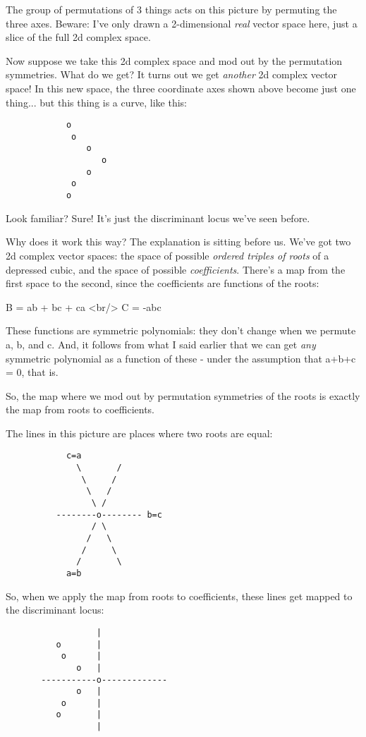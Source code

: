 The group of permutations of 3 things acts on this picture 
by permuting the three axes.  Beware: I've only drawn a 2-dimensional 
\emph{real} vector space here, just a slice of the full 2d complex space.  

Now suppose we take this 2d complex space and mod out by the 
permutation symmetries.  What do we get?  It turns out we get \emph{another}
2d complex vector space!   In this new space, the three coordinate axes
shown above become just one thing... but this thing is a curve, like
this:

\begin{verbatim}
            o
             o
                o
                   o
                o
             o
            o
\end{verbatim}
    
Look familiar?  Sure!  It's just the discriminant locus we've
seen before.

Why does it work this way?  The explanation is sitting before us.
We've got two 2d complex vector spaces: the space of possible
\emph{ordered triples of roots} of a depressed cubic, and the space
of possible \emph{coefficients}.  There's a map from the first space
to the second, since the coefficients are functions of the roots:

B = ab + bc + ca <br/>
C = -abc

These functions are symmetric polynomials: they don't change when
we permute a, b, and c.  And, it follows from what I said earlier 
that we can get \emph{any} symmetric polynomial as a function of these -
under the assumption that a+b+c = 0, that is.  

So, the map where we mod out by permutation symmetries of the roots 
is exactly the map from roots to coefficients.

The lines in this picture are places where two roots are equal:

\begin{verbatim}
            c=a        
              \       /
               \     /
                \   /
                 \ /
          --------o-------- b=c
                 / \
                /   \
               /     \
              /       \
            a=b
\end{verbatim}
    
So, when we apply the map from roots to coefficients, these lines
get mapped to the discriminant locus:

\begin{verbatim}
                  |
          o       |      
           o      |     
              o   |  
       -----------o-------------
              o   |           
           o      |     
          o       |
                  |
\end{verbatim}
    
